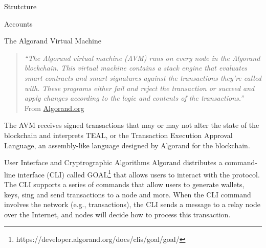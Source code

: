\documentclass[10pt,a4paper]{article}
\begin{document}
\begin{section}{Strutcture}
\begin{subsection}{Accounts}
\end{subsection}
\begin{subsection}{The Algorand Virtual Machine}\label{sect:avm}
    
    \begin{quote} 
        {\em``The Algorand virtual machine (AVM) runs on every node in the Algorand blockchain. 
    This virtual machine contains a stack engine that evaluates smart contracts and smart 
    signatures against the transactions they're called with. These programs either fail 
    and reject the transaction or succeed and apply changes according to the logic and 
    contents of the transactions.''} From \href{https://developer.algorand.org/docs/get-details/dapps/avm/}{Algorand.org}
    \end{quote}
    
The AVM receives signed transactions that may or may not alter the 
state of the blockchain and interprets TEAL, or the Transaction Execution 
Approval Language, an assembly-like language designed by Algorand 
for the blockchain.

\end{subsection}
\begin{subsection}{User Interface and Cryptrographic Algorithms}\label{sect:cliandkeys}
    Algorand distributes a command-line interface (CLI) called GOAL\footnote{https://developer.algorand.org/docs/clis/goal/goal/} 
    that allows users to interact with the protocol. The CLI supports a series of commands 
    that allow users to generate  wallets, keys, sing and send transactions to 
    a node and more.
    When the CLI command involves the network (e.g., transactions), the CLI
    sends a message to a relay node over the Internet, and nodes will decide
    how to process this transaction.


\end{subsection}
\end{section}
\end{document}
